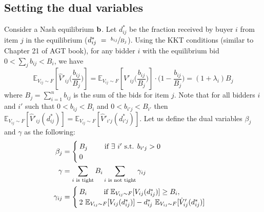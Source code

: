 \subsection{Setting the dual variables}

Consider a Nash equilibrium $\mathbf{b}$. Let $d_{ij}^*$ be the fraction received by buyer $i$ from item $j$ in the equilibrium ($d^{*}_{ij}~=~\sfrac{b_{ij}}{B_j}$).
Using the KKT conditions (similar to Chapter 21 of AGT book), for any bidder $i$ with the equilibrium bid $0 < \sum_{j} b_{ij} < B_{i}$, we have
$$
\mathbb{E}_{V_{ij} \sim F}\left[\hat{V}'_{ij}\biggl( \frac{b_{ij}}{B_j} \biggr)\right]
=  \mathbb{E}_{V_{ij} \sim F}\left[V'_{ij}\biggl( \frac{b_{ij}}{B_j} \biggr)\right] \cdot \biggl( 1 - \frac{b_{ij}}{B_j} \biggr)
= (1+\lambda_i) B_j
$$
where $B_j = \sum_{i=1}^{n} b_{ij}$ is the sum of the bids for item $j$.
Note that for all bidders $i$ and $i'$ such that $0 < b_{ij} < B_{i}$ and $0 < b_{i'j} < B_{i'}$ then
$  \mathbb{E}_{V_{ij} \sim F}[\hat{V}'_{ij}(d^{*}_{ij})]  =  \mathbb{E}_{V_{ij} \sim F}[\hat{V}'_{i'j}(d_{i'j}^*)]$.
%
Let us define the dual variables $\beta_j$ and $\gamma$ as the following:
\begin{align*}
    \beta_{j} &= \begin{cases}
        B_{j} \qquad \text{ if }  \exists \ i' \textnormal{ s.t. } b_{i'j} > 0 \\
	    0 \end{cases}\\
	\gamma &= \sum_{i \text{ is tight}} B_i \sum_{i \text{ is not tight}} \gamma_{ij}\\
	\gamma_{ij} &= \begin{cases}
        B_{i} \qquad \text{ if }  \mathbb{E}_{V_{ij} \sim F}[V_{ij}(d^{*}_{ij})] \geq B_{i}, \\
	    2 \ \mathbb{E}_{V_{ij} \sim F}[V_{ij}(d^{*}_{ij})] - d^{*}_{ij} \ \mathbb{E}_{V_{ij} \sim F}[\hat{V}'_{ij}(d^{*}_{ij})] \end{cases}
\end{align*}
